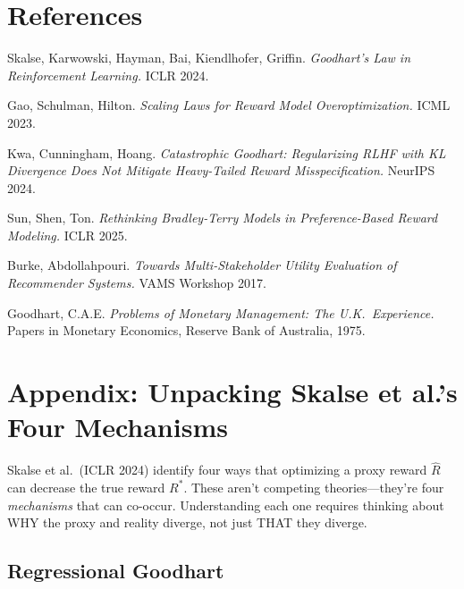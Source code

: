 \documentclass[11pt]{article}
\begin{document}
\section{References}

\begin{enumerate}[label={[\arabic*]}]
  \item Skalse, Karwowski, Hayman, Bai, Kiendlhofer, Griffin.
    \textit{Goodhart's Law in Reinforcement Learning.} ICLR 2024.

  \item Gao, Schulman, Hilton.
    \textit{Scaling Laws for Reward Model Overoptimization.} ICML 2023.

  \item Kwa, Cunningham, Hoang.
    \textit{Catastrophic Goodhart: Regularizing RLHF with KL Divergence
    Does Not Mitigate Heavy-Tailed Reward Misspecification.} NeurIPS 2024.

  \item Sun, Shen, Ton.
    \textit{Rethinking Bradley-Terry Models in Preference-Based Reward
    Modeling.} ICLR 2025.

  \item Burke, Abdollahpouri.
    \textit{Towards Multi-Stakeholder Utility Evaluation of Recommender
    Systems.} VAMS Workshop 2017.

  \item Goodhart, C.A.E.
    \textit{Problems of Monetary Management: The U.K.\ Experience.}
    Papers in Monetary Economics, Reserve Bank of Australia, 1975.
\end{enumerate}

\newpage
\section{Appendix: Unpacking Skalse et al.'s Four Mechanisms}

Skalse et al.\ (ICLR 2024) identify four ways that optimizing a proxy
reward $\hat{R}$ can decrease the true reward $R^*$. These aren't
competing theories---they're four \emph{mechanisms} that can co-occur.
Understanding each one requires thinking about WHY the proxy and reality
diverge, not just THAT they diverge.

\subsection{Regressional Goodhart}
\end{document}
